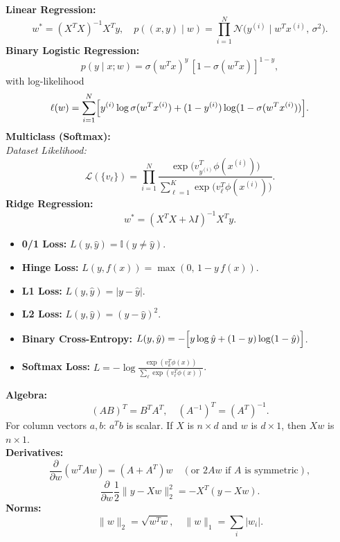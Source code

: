 \documentclass[10pt]{article}
\begin{document}
\begin{multicols}{2}
\begin{tcolorbox}[title=Optimal \(w\) \& Likelihood Functions]
\textbf{Linear Regression:}
\[
w^*=(X^T X)^{-1}X^Ty,\quad p((x,y)\mid w)=\prod_{i=1}^N \mathcal{N}\bigl(y^{(i)}\mid w^T x^{(i)},\,\sigma^2\bigr).
\]
\textbf{Binary Logistic Regression:}
\[
p(y\mid x;w)=\sigma(w^T x)^y\,[1-\sigma(w^T x)]^{1-y},
\]
with log-likelihood
\[
\ell(w)=\sum_{i=1}^N \Bigl[y^{(i)}\log\sigma(w^T x^{(i)})+(1-y^{(i)})\log(1-\sigma(w^T x^{(i)}))\Bigr].
\]
\textbf{Multiclass (Softmax):}\\[0.5mm]
\textit{Dataset Likelihood:}
\[
\mathcal{L}(\{v_\ell\}) = \prod_{i=1}^N \frac{\exp\bigl(v_{y^{(i)}}^T\phi(x^{(i)})\bigr)}{\sum_{\ell=1}^K \exp\bigl(v_\ell^T\phi(x^{(i)})\bigr)}.
\]
\textbf{Ridge Regression:}
\[
w^*=(X^TX+\lambda I)^{-1}X^Ty.
\]
\end{tcolorbox}

\begin{tcolorbox}[title=Loss Functions]
\begin{itemize}[noitemsep, topsep=0pt]
  \item \textbf{0/1 Loss:} \(L(y,\hat{y})=\mathbb{I}(y\neq\hat{y})\).
  \item \textbf{Hinge Loss:} \(L(y,f(x))=\max(0,\,1-y\,f(x))\).
  \item \textbf{L1 Loss:} \(L(y,\hat{y})=|y-\hat{y}|\).
  \item \textbf{L2 Loss:} \(L(y,\hat{y})=(y-\hat{y})^2\).
  \item \textbf{Binary Cross-Entropy:} \(L(y,\hat{y})=-\Bigl[y\log\hat{y}+(1-y)\log(1-\hat{y})\Bigr]\).
  \item \textbf{Softmax Loss:} \(L=-\log\frac{\exp(v_k^T\phi(x))}{\sum_\ell \exp(v_\ell^T\phi(x))}\).
\end{itemize}
\end{tcolorbox}

\begin{tcolorbox}[title=Matrix Rules]
\textbf{Algebra:}
\[
(AB)^T=B^TA^T,\quad (A^{-1})^T=(A^T)^{-1}.
\]
For column vectors \(a,b\): \(a^T b\) is scalar. If \(X\) is \(n\times d\) and \(w\) is \(d\times1\), then \(Xw\) is \(n\times1\).\\[1mm]
\textbf{Derivatives:}
\[
\frac{\partial}{\partial w}(w^TAw)=(A+A^T)w\quad (\text{or }2Aw \text{ if }A\text{ is symmetric}),
\]
\[
\frac{\partial}{\partial w}\frac{1}{2}\|y-Xw\|_2^2=-X^T(y-Xw).
\]
\textbf{Norms:}
\[
\|w\|_2=\sqrt{w^Tw},\quad \|w\|_1=\sum_i|w_i|.
\]
\end{tcolorbox}


\end{multicols}
\end{document}
